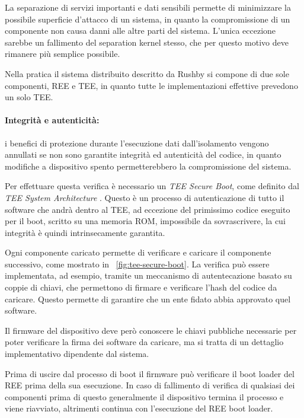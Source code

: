 \documentclass[12pt,italian]{report}
\begin{document}
 	La separazione di servizi importanti e dati sensibili permette di minimizzare la possibile superficie d'attacco di un sistema, in quanto la compromissione di un componente non causa danni alle altre parti del sistema. L'unica eccezione sarebbe un fallimento del separation kernel stesso, che per questo motivo deve rimanere più semplice possibile. 
 	
 	Nella pratica il sistema distribuito descritto da Rushby si compone di due sole componenti, REE e TEE, in quanto tutte le implementazioni effettive prevedono un solo TEE.
 	
 	\newpage
 	
 	\paragraph{Integrità e autenticità:} i benefici di protezione durante l'esecuzione dati dall'isolamento vengono annullati se non sono garantite integrità ed autenticità del codice, in quanto modifiche a dispositivo spento permetterebbero la compromissione del sistema.
 	
 	\bigbreak
 	
 	Per effettuare questa verifica è necessario un \textit{TEE Secure Boot}, come definito dal \textit{TEE System Architecture} \cite{gp2020systemarchitecture}. Questo è un processo di autenticazione di tutto il software che andrà dentro al TEE, ad eccezione del primissimo codice eseguito per il boot, scritto su una memoria ROM, impossibile da sovrascrivere, la cui integrità è quindi intrinsecamente garantita.
 	
 	\bigbreak
 	
 	Ogni componente caricato permette di verificare e caricare il componente successivo, come mostrato in \figurename~\ref{fig:tee-secure-boot}. La verifica può essere implementata, ad esempio, tramite un meccanismo di autentecazione basato su coppie di chiavi, che permettono di firmare e verificare l'hash del codice da caricare. Questo permette di garantire che un ente fidato abbia approvato quel software.
 	
 	Il firmware del dispositivo deve però conoscere le chiavi pubbliche necessarie per poter verificare la firma dei software da caricare, ma si tratta di un dettaglio implementativo dipendente dal sistema.
 	
 	\bigbreak
 	
 	Prima di uscire dal processo di boot il firmware può verificare il boot loader del REE prima della sua esecuzione. In caso di fallimento di verifica di qualsiasi dei componenti prima di questo generalmente il dispositivo termina il processo e viene riavviato, altrimenti continua con l'esecuzione del REE boot loader.
 	
\end{document}
